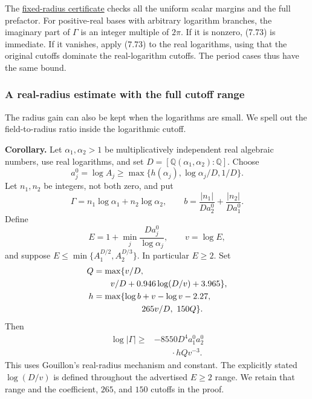 \documentclass[
  11pt,
  a4paper,
]{article}
\begin{document}
The \href{https://kokunoyumeto.github.io/open-math-courses-public/courses/TR-BAKER/verification/gouillon_fixed_radius.py}{fixed-radius
certificate} checks all the uniform scalar margins and the full
prefactor. For positive-real bases with arbitrary logarithm branches,
the imaginary part of \(\Gamma\) is an integer multiple of \(2\pi\). If
it is nonzero, (7.73) is immediate. If it vanishes, apply (7.73) to the
real logarithms, using that the original cutoffs dominate the
real-logarithm cutoffs. The period cases thus have the same bound.

\subsubsection{A real-radius estimate with the full cutoff
range}\label{a-real-radius-estimate-with-the-full-cutoff-range}

The radius gain can also be kept when the logarithms are small. We spell
out the field-to-radius ratio inside the logarithmic cutoff.

\textbf{Corollary.} Let \(\alpha_1,\alpha_2>1\) be multiplicatively
independent real algebraic numbers, use real logarithms, and set
\(D=[\mathbb Q(\alpha_1,\alpha_2):\mathbb Q]\). Choose \[
a_j^0=\log A_j\ge\max\{h(\alpha_j),\log\alpha_j/D,1/D\}.
\] Let \(n_1,n_2\) be integers, not both zero, and put \[
\Gamma=n_1\log\alpha_1+n_2\log\alpha_2,
\qquad b=\frac{|n_1|}{Da_2^0}+\frac{|n_2|}{Da_1^0}.
\] Define \[
E=1+\min_j\frac{Da_j^0}{\log\alpha_j},\qquad v=\log E,
\] and suppose \(E\le\min\{A_1^{D/2},A_2^{D/3}\}\). In particular
\(E\ge2\). Set \[
\begin{aligned}
Q&=\max\{v/D,\\
&\qquad v/D+0.946\log(D/v)+3.965\},\\
h&=\max\{\log b+v-\log v-2.27,\\
&\hspace{20mm}265v/D,\ 150Q\}.
\end{aligned}
\] Then \[
\begin{aligned}
\log|\Gamma|\ge{}&-8550D^4a_1^0a_2^0\\
&\qquad\cdot hQv^{-3}.
\end{aligned} \tag{7.75}
\] This uses Gouillon's real-radius mechanism and constant. The
explicitly stated \(\log(D/v)\) is defined throughout the advertised
\(E\ge2\) range. We retain that range and the coefficient, \(265\), and
\(150\) cutoffs in the proof.
\end{document}
